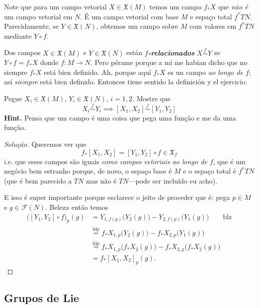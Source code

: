 Note que para um campo vetorial \(X \in \mathfrak{X}(M)\) temos um campo \(f_*X\) que \textit{não é} um campo vetorial em \(N\). É um campo vetorial com base \(M\) e espaço total  \(f^*TN\). Parecidamente, se \(Y \in \mathfrak{X}(N)\), obtemos um campo sobre \(M\) com valores em \(f^*TN\) mediante \(Y \circ f\).
\begin{defn}\leavevmode
Dos campos \(X \in \mathfrak{X}(M)\) e \(Y \in \mathfrak{X}(N)\) están \textit{\textbf{\(f\)-relacionados}} \(X \overset{f}{\sim}Y\) se \(Y \circ f =f_*X\) donde \(f:M \to N\). Pero pérame porque a mí me habían dicho que no siempre \(f_*X\) está bien definido. Ah, porque aquí \(f_*X\) es un campo \textit{ao longo de \(f\)}; así \textit{siempre} está bien definido. Entonces tiene sentido la definición y el ejercicio:
\end{defn}

\begin{exercise}\leavevmode
	Pegue \(X_i \in \mathfrak{X}(M)\), \(Y_i\in \mathfrak{X}(N)\), \(i=1,2\). Mostre que  \[X_i \overset{f}{\sim}Y_i\implies [X_1,X_2] \overset{f}{\sim}[Y_1,Y_2]\]
\textbf{Hint.} Pensa que um campo é uma coisa que pega uma função e me da uma função.
\end{exercise}

\begin{proof}[Solução]\leavevmode
	Queremos ver que
	\[f_*[X_1,X_2]=[Y_1,Y_2]\circ f \in \mathfrak{X}_f\]
i.e. que esses campos são iguais \textit{como campos vetoriais ao longo de \(f\)}, que é um negócio bem estranho porque, de novo, o espaço base é \(M\) e o espaço total é \(f^* TN\) (que é bem parecido a \(TN\) mas  não é \(TN\)---pode ser incluído eu acho).

E isso é super importante porque esclarece o jeito de proceder que é: pega \(p \in M\) e \(g \in \mathcal{F}(N)\). Beleza então temos
	\begin{align*}
	\Big([Y_1,Y_2]\circ f\Big)_p(g)&=Y_{1,f(p)}\Big(Y_2(g)\Big)-Y_{2,f(p)}\Big(Y_1(g)\Big)\qquad \text{blz} \\
				       &\overset{\operatorname{hip}}{=}f_*X_{1,p}\Big(Y_2(g)\Big)-f_*X_{2,p}\Big(Y_1(g)\Big)\\
&\overset{\operatorname{hip}}{=}f_*X_{1,p}\Big(f_*X_2(g)\Big)-f_*X_{2,p}\Big(f_*X_2(g)\Big)\\
&=f_*[X_1,X_2]_p(g).
	\end{align*}
\end{proof}

\subsection{Grupos de Lie}


